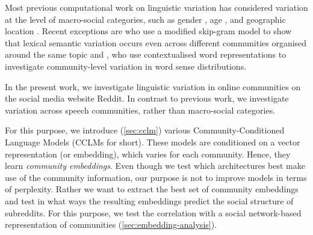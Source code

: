 \documentclass[11pt]{article}
\begin{document}
Most previous computational work on linguistic variation 
has considered variation at the level of macro-social categories, such as gender
\citep{Burger2011,Ciot2013,Bamman2014}, age \citep{Nguyen2013}, and
geographic location \citep{Eisenstein2010,Bamman2014a}.
Recent exceptions are \citet{DelTredici2017} who use a modified
skip-gram model to show that lexical semantic variation occurs even across 
different communities organised around the same topic and 
\citet{Lucy2021}, who use contextualised word representations to
investigate community-level variation in word sense distributions.

In the present work, we investigate linguistic variation
in online communities on the social media website Reddit. 
In contrast to previous work, we investigate variation across 
speech communities, rather than macro-social categories.


%  
%
%

For this purpose, we introduce (\cref{sec:cclm}) various
Community-Conditioned Language Models (CCLMs for short). These models
are conditioned on a vector representation (or embedding), which
varies for each community. Hence, they learn \emph{community
  embeddings}.  Even though we test which architectures best make use
of the community information, our purpose is not to improve models in
terms of perplexity. Rather we want to extract the best set of
community embeddings and test in what ways the resulting embeddings
predict the social structure of subreddits. For this purpose, we test
the correlation with a social network-based representation of
communities (\cref{sec:embedding-analysis}).
\end{document}
